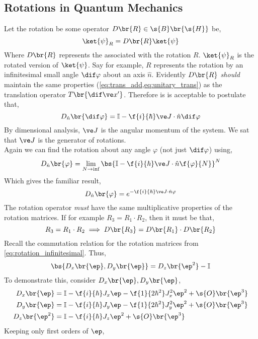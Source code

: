 \documentclass{article}
\begin{document}
\subsection{Rotations in Quantum Mechanics}
Let the rotation be some operator $D\br{R} \in \s{B}\br{\s{H}}$ be,
\[ \ket{\psi}_{R} = D\br{R} \ket{\psi} \]
Where $D\br{R}$ represents the  associated with the rotation $R$. $\ket{\psi}_R$ is the rotated version of $\ket{\psi}$. Say for example, $R$ represents the rotation by an infinitesimal small angle $\dif \varphi$ about an axis $\hat{n}$. Evidently $D\br{R}$ \textit{should} maintain the same properties (\cref{eq:trans_add,eq:unitary_trans}) as the translation operator $T\br{\dif \ve x'}$. Therefore is is acceptable to postulate that,
\[ D_{\hat n}\br{\dif \varphi} = \mathbb{I} - \f{i}{\hbar} \ve J \cdot \hat n \dif \varphi \]
By dimensional analysis, $\ve J$ is the angular momentum of the system. We sat that $\ve J$ is the generator of rotations. \\
Again we can find the rotation about any angle $\varphi$ (not just $\dif \varphi$) using,
\[D_{\hat n}\br{\varphi} = \lim_{N \to \inf} \bs{\mathbb{I} - \f{i}{\hbar} \ve J \cdot \hat n \f{\varphi}{N}}^N \]
Which gives the familiar result,
\[D_{\hat n}\br{\varphi} = e^{-\f{i}{\hbar} \ve J \cdot \hat n \varphi} \]
The rotation operator \textit{must} have the same multiplicative properties of the rotation matrices. If for example $R_3 = R_1 \cdot R_2$, then it must be that,
\[ R_3 = R_1 \cdot R_2 \implies D\br{R_3} = D\br{R_1} \cdot D\br{R_2} \]
Recall the commutation relation for the rotation matrices from \cref{eq:rotation_infinitesimal}. Thus,
\[ \bs{D_x\br{\ep}, D_y\br{\ep}} = D_z\br{\ep^2} - \mathbb{I} \]
To demonstrate this, consider $D_x\br{\ep}, D_y\br{\ep}$,
\begin{align*}
    D_x\br{\ep} &= \mathbb{I} - \f{i}{\hbar}  J_x \ep - \f{1}{2\hbar^2}J_x^2\ep^2 + \s{O}\br{\ep^3} \\
    D_y\br{\ep} &= \mathbb{I} - \f{i}{\hbar}  J_y \ep - \f{1}{2\hbar^2}J_y^2\ep^2 + \s{O}\br{\ep^3} \\
    D_z\br{\ep^2} &= \mathbb{I} - \f{i}{\hbar}  J_z \ep^2 + \s{O}\br{\ep^3} \\
\end{align*}
Keeping only first orders of $\ep$,
\end{document}
